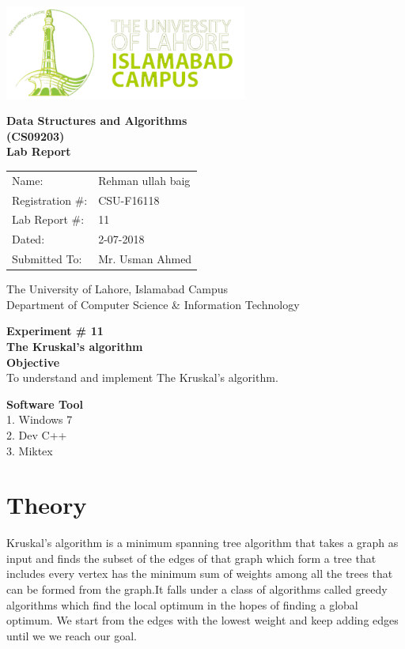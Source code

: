 \documentclass[12pt]{article}            %
\begin{document}
\begin{titlepage}
    \centering
  \vfill
    \includegraphics[width=8cm]{uni_logo.png} \\ 
	\vskip2cm
    {\bfseries\Large
	Data Structures and Algorithms \\ (CS09203)\\
	
	\vskip2cm
	Lab Report 
	 
	\vskip2cm
	}    

\begin{center}
\begin{tabular}{ l l  } 

Name: & Rehman ullah baig \\ 
Registration \#: &CSU-F16118 \\ 
Lab Report \#: & 11 \\ 
 Dated:& 2-07-2018\\ 
Submitted To:& Mr. Usman Ahmed\\ 

\end{tabular}
\end{center}
    \vfill
    The University of Lahore, Islamabad Campus\\
Department of Computer Science \& Information Technology
\end{titlepage}


    
    {\bfseries\Large
\centering
	Experiment \# 11 \\

The Kruskal's algorithm\\
	
	}    
 \vskip1cm
 \textbf {Objective}\\  To understand and implement The Kruskal's algorithm.
 
 \textbf {Software Tool} \\
1. Windows 7  \\
2. Dev C++\\
3. Miktex   \\

\section{Theory }              
Kruskal's algorithm is a minimum spanning tree algorithm that takes a graph as input and finds the subset of the edges of that graph which form a tree that includes every vertex has the minimum sum of weights among all the trees that can be formed from the graph.It falls under a class of algorithms called greedy algorithms which find the local optimum in the hopes of finding a global optimum.
We start from the edges with the lowest weight and keep adding edges until we we reach our goal.
\end{document}
